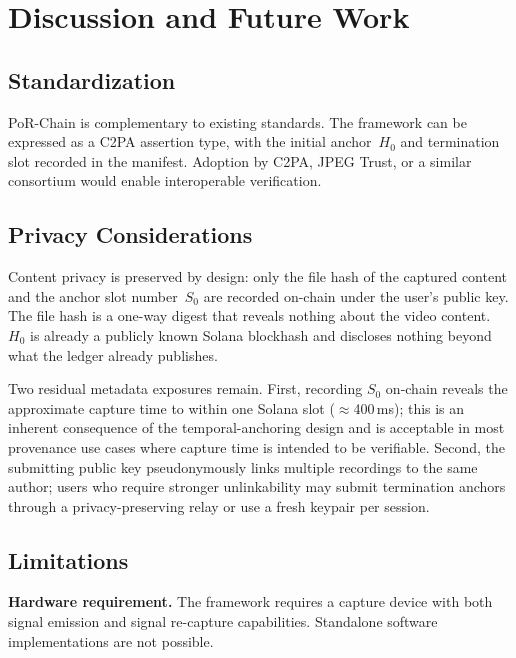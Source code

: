 \documentclass[11pt]{article}
\begin{document}
\section{Discussion and Future Work}

\subsection{Standardization}

PoR-Chain is complementary to existing standards. The framework can be expressed as
a C2PA assertion type, with the initial anchor~$H_0$ and termination slot recorded in
the manifest. Adoption by C2PA, JPEG Trust, or a similar consortium would enable
interoperable verification.

\subsection{Privacy Considerations}

Content privacy is preserved by design: only the file hash of the captured content
and the anchor slot number~$S_0$ are recorded on-chain under the user's public key.
The file hash is a one-way digest that reveals nothing about the video content.
$H_0$ is already a publicly known Solana blockhash and discloses nothing beyond
what the ledger already publishes.

Two residual metadata exposures remain. First, recording $S_0$ on-chain reveals the
approximate capture time to within one Solana slot ($\approx$400\,ms); this is an
inherent consequence of the temporal-anchoring design and is acceptable in most
provenance use cases where capture time is intended to be verifiable. Second, the
submitting public key pseudonymously links multiple recordings to the same author;
users who require stronger unlinkability may submit termination anchors through a
privacy-preserving relay or use a fresh keypair per session.

\subsection{Limitations}
\label{sec:limitations}

\textbf{Hardware requirement.} The framework requires a capture device with both
signal emission and signal re-capture capabilities. Standalone software
implementations are not possible.
\end{document}
